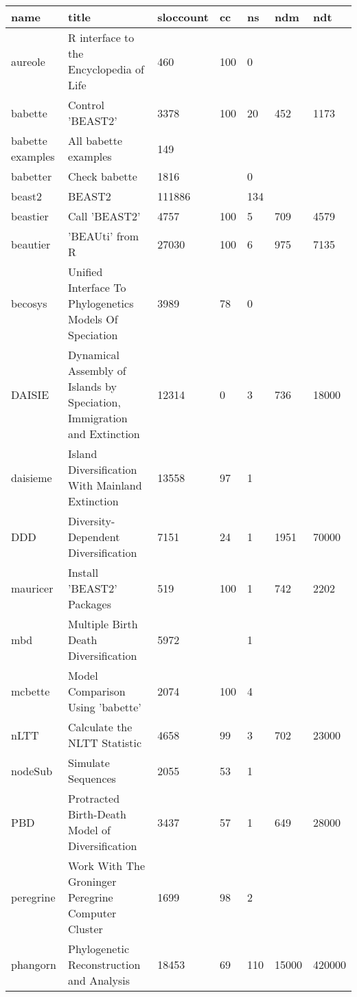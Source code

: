 \begin{table}[ht]
\centering
\begin{tabular}{p{}p{}p{}p{}p{}p{}p{}}
  \hline
name & title & sloccount & cc & ns & ndm & ndt \\ 
  \hline
aureole & R interface to the Encyclopedia of Life & 460 & 100 &   0 &  &  \\ 
  babette & Control 'BEAST2' & 3378 & 100 &  20 & 452 & 1173 \\ 
  babette examples & All babette examples & 149 &  &  &  &  \\ 
  babetter & Check babette & 1816 &  &   0 &  &  \\ 
  beast2 & BEAST2 & 111886 &  & 134 &  &  \\ 
  beastier & Call 'BEAST2' & 4757 & 100 &   5 & 709 & 4579 \\ 
  beautier & 'BEAUti' from R & 27030 & 100 &   6 & 975 & 7135 \\ 
  becosys & Unified Interface To Phylogenetics Models Of Speciation & 3989 &  78 &   0 &  &  \\ 
  DAISIE & Dynamical Assembly of Islands by Speciation, Immigration and
        Extinction & 12314 &   0 &   3 & 736 & 18000 \\ 
  daisieme & Island Diversification With Mainland Extinction & 13558 &  97 &   1 &  &  \\ 
  DDD & Diversity-Dependent Diversification & 7151 &  24 &   1 & 1951 & 70000 \\ 
  mauricer & Install 'BEAST2' Packages & 519 & 100 &   1 & 742 & 2202 \\ 
  mbd & Multiple Birth Death Diversification & 5972 &  &   1 &  &  \\ 
  mcbette & Model Comparison Using 'babette' & 2074 & 100 &   4 &  &  \\ 
  nLTT & Calculate the NLTT Statistic & 4658 &  99 &   3 & 702 & 23000 \\ 
  nodeSub & Simulate Sequences & 2055 &  53 &   1 &  &  \\ 
  PBD & Protracted Birth-Death Model of Diversification & 3437 &  57 &   1 & 649 & 28000 \\ 
  peregrine & Work With The Groninger Peregrine Computer Cluster & 1699 &  98 &   2 &  &  \\ 
  phangorn & Phylogenetic Reconstruction and Analysis & 18453 &  69 & 110 & 15000 & 420000 \\ 

\end{tabular}
\end{table}
